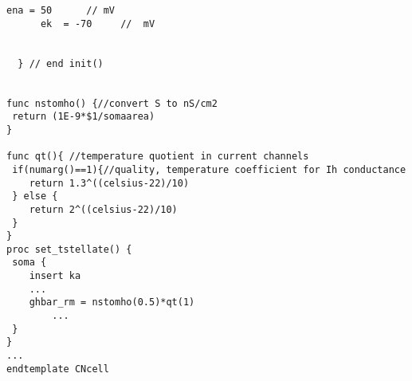 \begin{appendix}
\begin{lstlisting}[label=lst:CellTemplate,caption=Rothman and Manis cochlear nucleus cell template (in CNcell.tem)]
      ena = 50		// mV
      ek  = -70		//  mV


  }	// end init()


func nstomho() {//convert S to nS/cm2
 return (1E-9*$1/somaarea)
}

func qt(){ //temperature quotient in current channels
 if(numarg()==1){//quality, temperature coefficient for Ih conductance	
 	return 1.3^((celsius-22)/10)
 } else {
	return 2^((celsius-22)/10)
 }
}
proc set_tstellate() {
 soma {
	insert ka
	...
	ghbar_rm = nstomho(0.5)*qt(1)
        ...  
 }
}
...
endtemplate CNcell 

\end{lstlisting}


\end{appendix}


